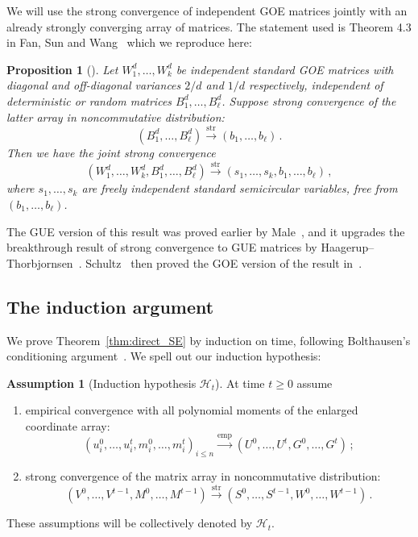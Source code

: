 \documentclass[11pt]{article}
\newtheorem{proposition}[theorem]{Proposition}
\theoremstyle{definition}
\newtheorem{assumption}[theorem]{Assumption}
\theoremstyle{remark}
\numberwithin{equation}{section}
\numberwithin{theorem}{section}
\newcommand{\xto}{\xrightarrow}
\begin{document}
We will use the strong convergence of independent GOE matrices jointly with an already strongly converging array of matrices.   
The statement used is Theorem 4.3 in Fan, Sun and Wang~\cite{fan2021principal} which we reproduce here:

\begin{proposition}[\cite{fan2021principal}]\label{prop:strong-free}
Let $W_1^d,\ldots,W_k^d$ be independent standard GOE matrices with diagonal and off-diagonal variances $2/d$ and $1/d$ respectively, independent of deterministic or random matrices $B_1^d,\ldots,B_\ell^d$. Suppose strong convergence of the latter array in noncommutative distribution: 
\[(B_1^d,\ldots,B_\ell^d) \xto{\mathrm{str}} (b_1,\ldots,b_\ell)\,.\]   
Then we have the joint strong convergence
\[
  (W_1^d,\ldots,W_k^d,B_1^d,\ldots,B_\ell^d)
\xrightarrow{\mathrm{str}} 
  (s_1,\ldots,s_k,b_1,\ldots,b_\ell)\,,
\]
where $s_1,\ldots,s_k$ are freely independent standard semicircular variables, free from $(b_1,\ldots,b_\ell)$.
\end{proposition}


The GUE version of this result was proved earlier by Male~\cite{male2012norm}, and it upgrades the breakthrough result of strong convergence to GUE matrices by Haagerup--Thorbjornsen~\cite{haagerup2005new}. Schultz~\cite{schultz2005non} then proved the GOE version of the result in~\cite{haagerup2005new}.




\subsection{The induction argument}
 We prove Theorem~\ref{thm:direct_SE} by induction on time, following Bolthausen's conditioning argument~\cite{bolthausen2014iterative}.
%
We spell out our induction hypothesis:  
\begin{assumption}[Induction hypothesis $\mathcal{H}_t$]\label{ass:induction-hypotheses}
At time $t \ge 0$ assume
\begin{enumerate}[label=(\roman*)]
\item empirical convergence with all polynomial moments of the enlarged
coordinate array:
\[
  (u_i^0,\ldots,u_i^t,m_i^0,\ldots,m_i^t)_{i\le n}
\xto{\mathrm{emp}}
(U^0,\ldots,U^t,G^0,\ldots,G^t)\,;
\]
\item strong convergence of the matrix array in noncommutative distribution: 
\[
(V^0,\ldots,V^{t-1},M^0,\ldots,M^{t-1}) 
\xto{\mathrm{str}}
(S^0,\ldots,S^{t-1},W^0,\ldots,W^{t-1})\,.
\]
\end{enumerate}
These assumptions will be collectively denoted by $\mathcal{H}_t$.
\end{assumption}
\end{document}
